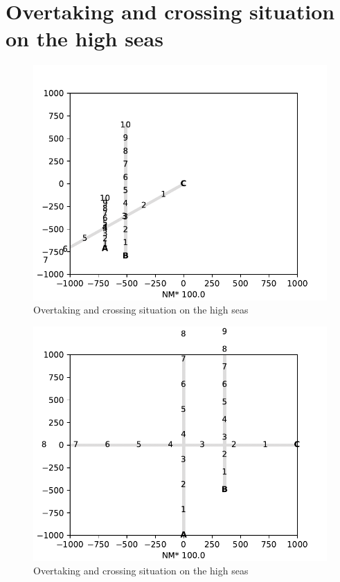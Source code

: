 \section{Overtaking and crossing situation on the high seas}
\begin{figure}[H]
    \centering
    \includegraphics[width=\textwidth,height=0.75\textheight,keepaspectratio]{Figures/Scenario/overtaking-and-crossing.pdf}
    \caption{Overtaking and crossing situation on the high seas \cite{ecolreg_overtaking-and-crossing}}
    \label{fig:overtaking-and-crossing}
\end{figure}
\begin{figure}[H]
    \centering
    \includegraphics[width=\textwidth,height=0.75\textheight,keepaspectratio]{Figures/Scenario/overtaking-and-crossing-2.pdf}
    \caption{Overtaking and crossing situation on the high seas \cite{ecolreg_overtaking-and-crossing-2}}
    \label{fig:overtaking-and-crossing-2}
\end{figure}